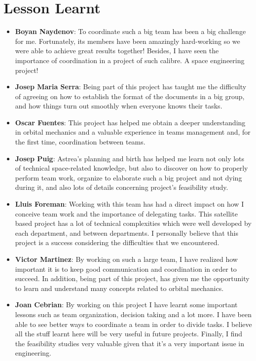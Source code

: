\chapter{Lesson Learnt}
{\footnotesize
\begin{itemize}
\item \textbf{Boyan Naydenov}: To coordinate such a big team has been a big challenge for me. Fortunately, its members have been amazingly hard-working so we were able to achieve great results together! Besides, I have seen the importance of coordination in a project of such calibre. A space engineering project!

 
\item \textbf{Josep Maria Serra}: Being part of this project has taught me the difficulty of agreeing on how to establish the format of the documents in a big group, and how things turn out smoothly when everyone knows their tasks.

 
\item \textbf{Oscar Fuentes}: This project has helped me obtain a deeper understanding in orbital mechanics and a valuable experience in teams management and, for the first time, coordination between teams.

 
\item \textbf{Josep Puig}: Astrea's planning and birth has helped me learn not only lots of technical space-related knowledge, but also to discover on how to properly perform team work, organize to elaborate such a big project and not dying during it, and also lots of details concerning project's feasibility study.

 
\item \textbf{Lluis Foreman}: Working with this team has had a direct impact on how I conceive team work and the importance of delegating tasks. This satellite based project has a lot of technical complexities which were well developed by each department, and between departments. I personally believe that this project is a success considering the difficulties that we encountered. 

 
\item \textbf{Victor Martinez}: By working on such a large team, I have realized how important it is to keep good communication and coordination in order to succeed. In addition, being part of this project, has given me the opportunity to learn and understand many concepts related to orbital mechanics.

 
\item \textbf{Joan Cebrian}: By working on this project I have learnt some important lessons such as team organization, decision taking and a lot more. I have been able to see better ways to coordinate a team in order to divide tasks. I believe all the stuff learnt here will be very useful in future projects. Finally, I find the feasibility studies very valuable given that it's a very important issue in engineering. 


\end{itemize}}
